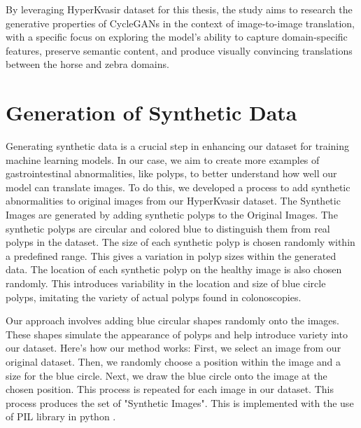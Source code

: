 \documentclass[UKenglish,12pt]{master-style}
\begin{document}
By leveraging HyperKvasir dataset for this thesis, the study aims to research the generative properties of CycleGANs in the context of image-to-image translation, with a specific focus on exploring the model's ability to capture domain-specific features, preserve semantic content, and produce visually convincing translations between the horse and zebra domains.


\section{Generation of Synthetic Data}

Generating synthetic data is a crucial step in enhancing our dataset for training machine learning models. In our case, we aim to create more examples of gastrointestinal abnormalities, like polyps, to better understand how well our model can translate images. To do this, we developed a process to add synthetic abnormalities to original images from our HyperKvasir dataset. The Synthetic Images are generated by adding synthetic polyps to the Original Images. The synthetic polyps are circular and colored blue to distinguish them from real polyps in the dataset. The size of each synthetic polyp is chosen randomly within a predefined range. This gives a variation in polyp sizes within the generated data. The location of each synthetic polyp on the healthy image is also chosen randomly. This introduces variability in the location and size of blue circle polyps, imitating the variety of actual polyps found in colonoscopies.

Our approach involves adding blue circular shapes randomly onto the images. These shapes simulate the appearance of polyps and help introduce variety into our dataset. Here's how our method works: First, we select an image from our original dataset. Then, we randomly choose a position within the image and a size for the blue circle. Next, we draw the blue circle onto the image at the chosen position. This process is repeated for each image in our dataset. This process produces the set of "Synthetic Images". This is implemented with the use of PIL library in python \cite{PyTorch_horse2zebra}.
\end{document}
